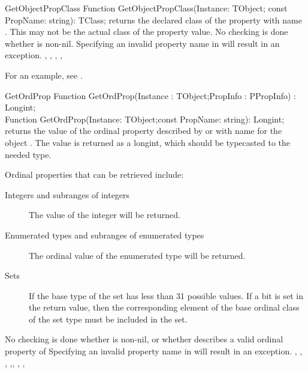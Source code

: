 
\begin{function}{GetObjectPropClass}
\Declaration
Function GetObjectPropClass(Instance: TObject; const PropName: string): TClass;                                             
\Description
{} returns the declared class of the property with name 
. This may not be the actual class of the property value.
\Errors
No checking is done whether  is non-nil.
Specifying an invalid property name in  will result in an
 exception.
\SeeAlso
{}, , ,
, 
\end{function}

For an example, see .

\begin{function}{GetOrdProp}
\Declaration
Function GetOrdProp(Instance : TObject;PropInfo : PPropInfo) : Longint;\\
Function GetOrdProp(Instance: TObject;const PropName: string): Longint;
\Description
{} returns the value of the ordinal property described by
 or with name  for the object . 
The value is returned as a longint, which should be typecasted to the 
needed type.

Ordinal properties that can be retrieved include:
\begin{description}
\item[Integers and subranges of integers] The value of the integer will be
returned.
\item[Enumerated types and subranges of enumerated types] The ordinal value
of the enumerated type will be returned.
\item[Sets] If the base type of the set has less than 31 possible values.
If a bit is set in the return value, then the corresponding element of the
base ordinal class of the set type must be included in the set.
\end{description}
\Errors
No checking is done whether  is non-nil, or whether
 describes a valid ordinal property of 
Specifying an invalid property name in  will result in an
 exception.
\SeeAlso
{}, , ,
,, ,
, 
\end{function}

